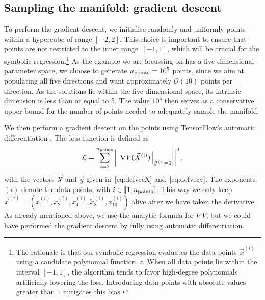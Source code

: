 \documentclass[11pt,a4paper]{article}
\begin{document}
	\subsection{Sampling the manifold: gradient descent} \label{sec:graddes}
	To perform the gradient descent, we initialise randomly and uniformly points within a hypercube of range $[-2,2]$. This choice is important to ensure that points are not restricted to the inner range~$[-1,1]$, which will be crucial for the symbolic regression.\footnote{The rationale is that our symbolic regression evaluates the data points $\vec{x}^{(i)}$ using a candidate polynomial function~$z$. When all data points lie within the interval $[-1, 1]$, the algorithm tends to favor high-degree polynomials artificially lowering the loss. Introducing data points with absolute values greater than 1 mitigates this bias.} As the example we are focussing on has a five-dimensional parameter space, we choose to generate $n_{\rm points}=10^5$ points, since we aim at populating all five directions and want approximately $\mathcal{O}(10)$ points per direction. As the solutions lie within the five dimensional space, its intrinsic dimension is less than or equal to 5. The value $10^5$ then serves as a conservative upper bound for the number of points needed to adequately sample the manifold.
	
	We then perform a gradient descent on the points using TensorFlow’s automatic differentiation \cite{tensorflow2015-whitepaper}. The loss function is defined as
	\begin{equation} \label{eq:lossgraddes}
		\mathcal{L} = \sum_{i = 1}^{n_{\rm points}} \left|\left|\left.\nabla V(\vec{X}^{(i)})\,\right|_{\vec{y}^{\,(i)}=0}\right|\right|^2,
	\end{equation}
with the vectors $\vec{X}$ and $\vec{y}$ given in~\eqref{eq:defvecX} and~\eqref{eq:defvecy}. The exponents $(i)$ denote the data points, with $i\in\llbracket1,n_{\rm points}\rrbracket$. This way we only keep $\vec{x}^{(i)} = (x^{(i)}_1,x^{(i)}_2,x^{(i)}_4,\tilde{x}^{(i)}_8,x^{(i)}_{10})$ alive after we have taken the derivative. As already mentioned above, we use the analytic formula for $\nabla V$, but we could have performed the gradient descent by fully using automatic differentiation.
\end{document}
